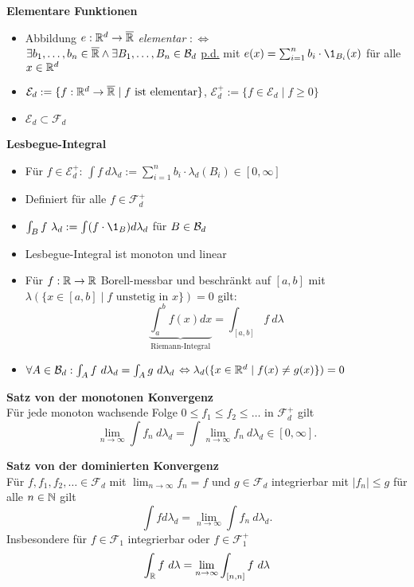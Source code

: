 \textbf{Elementare Funktionen}
\begin{itemize}

\item Abbildung $e:\mathbb{R}^d\to\overline{\mathbb{R}}$ \textit{elementar} $:\Leftrightarrow$\\
$\exists b_1,\ldots,b_n\in\overline{\mathbb{R}}\wedge\exists B_1,\ldots,B_n\in\mathcal{B}_{d}$
\underline{p.d.} mit $e(x)=\sum_{i=1}^{n} b_i\cdot \1_{B_i}(x)$ für alle $x\in\mathbb{R}^d$

\item $\mathcal{E}_d:=\{f:\mathbb{R}^d\to\overline{\mathbb{R}}\mid f \text{ ist elementar}\}$,
$\mathcal{E}_d^+:=\{f\in\mathcal{E}_d\mid f\geq 0\}$

\item $\mathcal{E}_d\subset\mathcal{F}_d$
\end{itemize}

\textbf{Lesbegue-Integral}
\begin{itemize}
\item Für $f\in\mathcal{E}_d^+$: 
$\int f~d\lambda_d:=\sum_{i=1}^{n} b_i\cdot\lambda_d(B_i)\in [0,\infty]$

\item Definiert für alle $f\in\mathcal{F}_d^+$

\item $\int_B f~\lambda_d:=\int (f\cdot \1_B)d\lambda_d$ für $B\in\mathcal{B}_{d}$

\item Lesbegue-Integral ist monoton und linear

\item Für $f:\mathbb{R}\to\mathbb{R}$ Borell-messbar und beschränkt auf $[a,b]$ mit
\mbox{$\lambda(\{x\in[a,b]\mid f \text{ unstetig in }x\})=0$} gilt:
\[
	\underbrace{\int_{a}^{b}f(x)dx}_{\text{Riemann-Integral}}
	= \int_{[a,b]} f~d\lambda
\]

\item $\forall A\in\mathcal{B}_{d}:\int_A f~d\lambda_d = \int_A g~d\lambda_d$
$\Leftrightarrow \lambda_d(\{x\in\mathbb{R}^d\mid f(x)\neq g(x)\})=0$
\end{itemize}

\textbf{Satz von der monotonen Konvergenz}\\
Für jede monoton wachsende Folge $0\leq f_1\leq f_2\leq\ldots$
in $\mathcal{F}_d^+$ gilt
\[\lim_{n\to\infty}\int f_n~d\lambda_d=
\int\lim_{n\to\infty} f_n~d\lambda_d\in [0,\infty].\]

\textbf{Satz von der dominierten Konvergenz}\\
Für $f,f_1,f_2,\ldots\in\mathcal{F}_d$ mit $\lim_{n\to\infty} f_n=f$ 
und $g\in\mathcal{F}_d$ integrierbar mit $|f_n|\leq g$ für alle $n\in\mathbb{N}$ gilt
\[
	\int fd\lambda_d=\lim_{n\to\infty} \int f_n~d\lambda_d.
\]
Insbesondere für $f\in\mathcal{F}_1$ integrierbar oder $f\in\mathcal{F}_1^+$
\[
	\int_{\mathbb{R}} f~d\lambda=\lim_{n\to\infty} \int_{[n,n]} f~d\lambda
\]


